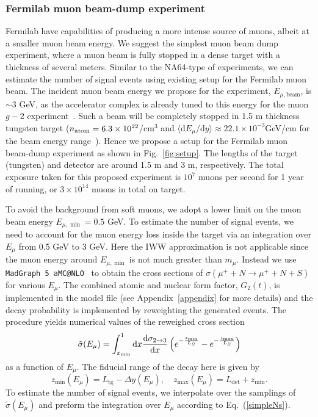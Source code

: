 \documentclass[prd,onecolumn,notitlepage,
nofootinbib,aps,tightenlines,
preprintnumbers,amsmath,amssymb,amsfonts,showpacs,superscriptaddress]{revtex4-1}
\renewcommand{\eqref}[1]{Eq.~(\ref{#1})}
\newcommand{\beq}{\begin{equation}}
\newcommand{\eeq}{\end{equation}}
\renewcommand{\d}{\text{d}}
\renewcommand{\d}{\text{d}}
\begin{document}
\subsubsection{Fermilab muon beam-dump experiment}
Fermilab have capabilities of producing a more intense source of muons, albeit at a smaller muon beam energy. 
We suggest the simplest muon beam dump experiment, where a muon beam is fully stopped in a 
dense target with  a thickness of several meters.
Similar to the NA64-type of experiments, we can estimate the number of signal events using existing setup for the Fermilab 
 muon beam.
The incident muon beam energy we propose for the experiment, $E_{\mu, \text{beam}}$, is $\sim3$ GeV, as the accelerator complex is already tuned to 
this energy for the muon $g-2$ experiment~\cite{Chapelain:2017syu}. Such a beam will be completely stopped in 1.5 m thickness tungsten target ($n_{\rm atom}=6.3\times 10^{22}$/cm$^3$ and $\langle \d E_\mu/\d y \rangle \approx 22.1\times 10^{-3}$GeV/cm for the beam energy range~\cite{pdgmat}). Hence we propose a setup for the Fermilab muon beam-dump experiment as shown in Fig.~\ref{fig:setup}. The lengths of the target  (tungsten) and detector are around 1.5 m and 3 m, respectively. 
The total exposure taken for this proposed experiment is $10^7$ muons per second for 1 year of running, or 
$3\times 10^{14}$ muons in total on target. 

To avoid the background from soft muons, we adopt a lower limit on the muon beam energy $E_{\mu, \min}=0.5$ GeV.  
To estimate the number of signal events, we need to 
account for the muon energy loss inside the target via an integration over $E_\mu$ from 0.5 GeV to 3 GeV. Here the IWW approximation is not applicable since the muon energy around $E_{\mu,\min}$ is not much greater than $m_\mu$. Instead we use \texttt{MadGraph 5 aMC@NLO}~\cite{Alwall:2014hca} to obtain the cross sections of $\sigma(\mu^+ + N \to \mu^+ + N + S)$ for various $E_\mu$. The combined atomic and nuclear form factor, $G_2(t)$, is implemented in the model file (see Appendix~\ref{appendix} for more details) and the decay probability is implemented by reweighting the generated events. The procedure yields numerical values of the reweighed cross section 
\beq
\tilde \sigma (E_\mu) = \int_{x_{\min}}^1 \d x  {\d\sigma_{2\to 3} \over \d x}  \left(e^{-{z_{\min}\over L_S}}-e^{-{z_{\max}\over L_S}}\right)
\eeq
as a function of $E_\mu$. The fiducial range of the decay here is given by
\beq
z_{\min} (E_\mu)= L_\text{tg} - \Delta y (E_\mu), \quad z_{\max} (E_\mu)= L_\text{det} +z_{\min}.
\eeq
To estimate the number of signal events,  we interpolate over the samplings of $\tilde \sigma (E_\mu)$ and preform the integration over $E_\mu$ according to \eqref{simpleNs}.
\end{document}
